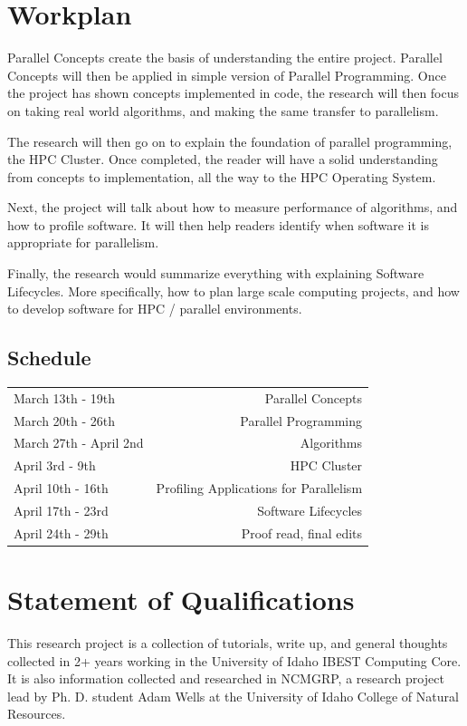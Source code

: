 \pagebreak


\section{Workplan}

Parallel Concepts create the basis of understanding the entire project. 
Parallel Concepts will then be applied in simple version of Parallel 
Programming. Once the project has shown concepts implemented in code, the 
research will then focus on taking real world algorithms, and making the same
transfer to parallelism. 

The research will then go on to explain the foundation of parallel programming,
the HPC Cluster. Once completed, the reader will have a solid understanding 
from concepts to implementation, all the way to the HPC Operating System.

Next, the project will talk about how to measure performance of algorithms,
and how to profile software. It will then help readers identify when software
it is appropriate for parallelism.

Finally, the research would summarize everything with explaining Software
Lifecycles. More specifically, how to plan large scale computing projects, 
and how to develop software for HPC / parallel environments. 

\subsection{Schedule}

\begin{tabular}{ l r }
  March 13th - 19th		& Parallel Concepts \\
  March 20th - 26th 		& Parallel Programming \\
  March 27th - April 2nd	& Algorithms \\
  April 3rd - 9th		& HPC Cluster \\
  April 10th - 16th		& Profiling Applications for Parallelism\\
  April 17th - 23rd		& Software Lifecycles \\
  April 24th - 29th		& Proof read, final edits \\
	
\end{tabular}


\section{Statement of Qualifications}
This research project is a collection of tutorials, write up, and general 
thoughts collected in 2+ years working in the University of Idaho IBEST 
Computing Core. It is also information collected and researched in NCMGRP, a
research project lead by Ph. D. student Adam Wells at the University of Idaho 
College of Natural Resources. 

